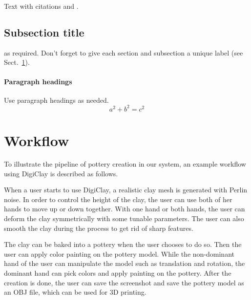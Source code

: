 Text with citations \cite{RefB} and \cite{RefJ}.
\subsection{Subsection title}
\label{sec:2}
as required. Don't forget to give each section
and subsection a unique label (see Sect.~\ref{sec:1}).
\paragraph{Paragraph headings} Use paragraph headings as needed.
\begin{equation}
a^2+b^2=c^2
\end{equation}










\section{Workflow}
\label{sec:1}











To illustrate the pipeline of pottery creation in our system, an example workflow using DigiClay is described as follows.

When a user starts to use DigiClay, a realistic clay mesh is generated with Perlin noise. In order to control the height of the clay, the user can use both of her hands to move up or down together. With one hand or both hands, the user can deform the clay symmetrically with some tunable parameters. The user can also smooth the clay during the process to get rid of sharp features.

The clay can be baked into a pottery when the user chooses to do so. Then the user can apply color painting on the pottery model. While the non-dominant hand of the user can manipulate the model such as translation and rotation, the dominant hand can pick colors and apply painting on the pottery. After the creation is done, the user can save the screenshot and save the pottery model as an OBJ file, which can be used for 3D printing.












